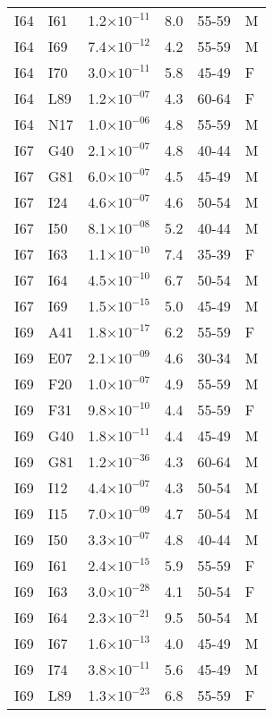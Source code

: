 \begin{longtable}{lllrll}
   I64 & I61 & 1.2$\times10^{-11}$ & 8.0 & 55-59 & M \\ 
   I64 & I69 & 7.4$\times10^{-12}$ & 4.2 & 55-59 & M \\ 
   I64 & I70 & 3.0$\times10^{-11}$ & 5.8 & 45-49 & F \\ 
   I64 & L89 & 1.2$\times10^{-07}$ & 4.3 & 60-64 & F \\ 
   I64 & N17 & 1.0$\times10^{-06}$ & 4.8 & 55-59 & M \\ 
   I67 & G40 & 2.1$\times10^{-07}$ & 4.8 & 40-44 & M \\ 
   I67 & G81 & 6.0$\times10^{-07}$ & 4.5 & 45-49 & M \\ 
   I67 & I24 & 4.6$\times10^{-07}$ & 4.6 & 50-54 & M \\ 
   I67 & I50 & 8.1$\times10^{-08}$ & 5.2 & 40-44 & M \\ 
   I67 & I63 & 1.1$\times10^{-10}$ & 7.4 & 35-39 & F \\ 
   I67 & I64 & 4.5$\times10^{-10}$ & 6.7 & 50-54 & M \\ 
   I67 & I69 & 1.5$\times10^{-15}$ & 5.0 & 45-49 & M \\ 
   I69 & A41 & 1.8$\times10^{-17}$ & 6.2 & 55-59 & F \\ 
   I69 & E07 & 2.1$\times10^{-09}$ & 4.6 & 30-34 & M \\ 
   I69 & F20 & 1.0$\times10^{-07}$ & 4.9 & 55-59 & M \\ 
   I69 & F31 & 9.8$\times10^{-10}$ & 4.4 & 55-59 & F \\ 
   I69 & G40 & 1.8$\times10^{-11}$ & 4.4 & 45-49 & M \\ 
   I69 & G81 & 1.2$\times10^{-36}$ & 4.3 & 60-64 & M \\ 
   I69 & I12 & 4.4$\times10^{-07}$ & 4.3 & 50-54 & M \\ 
   I69 & I15 & 7.0$\times10^{-09}$ & 4.7 & 50-54 & M \\ 
   I69 & I50 & 3.3$\times10^{-07}$ & 4.8 & 40-44 & M \\ 
   I69 & I61 & 2.4$\times10^{-15}$ & 5.9 & 55-59 & F \\ 
   I69 & I63 & 3.0$\times10^{-28}$ & 4.1 & 50-54 & F \\ 
   I69 & I64 & 2.3$\times10^{-21}$ & 9.5 & 50-54 & M \\ 
   I69 & I67 & 1.6$\times10^{-13}$ & 4.0 & 45-49 & M \\ 
   I69 & I74 & 3.8$\times10^{-11}$ & 5.6 & 45-49 & M \\ 
   I69 & L89 & 1.3$\times10^{-23}$ & 6.8 & 55-59 & F \\ 

\end{longtable}
